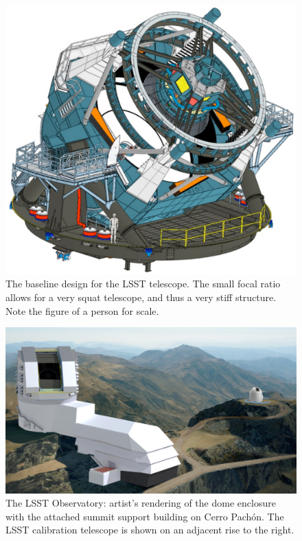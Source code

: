 \documentclass{emulateapj}
\begin{document}
\begin{figure}
\includegraphics[width=1.0\hsize,clip]{telescopeGreen.pdf}
\caption{The baseline design for the 
LSST telescope.  The small focal ratio allows for a very squat
telescope, and thus a very stiff structure.  Note the figure of a person for scale.} 
\label{Fig:telescope}
\end{figure}



\begin{figure}
\includegraphics[width=1.0\hsize,clip]{observatoryFull.pdf}
\caption{The LSST Observatory: artist's rendering of the dome enclosure 
with the attached summit support building on Cerro Pach\'{o}n. The LSST calibration 
telescope is shown on an adjacent rise to the right.} 
\label{Fig:observatory}
\end{figure}
\end{document}
